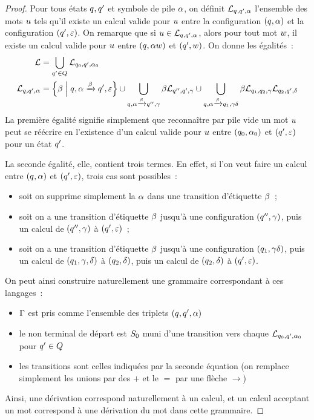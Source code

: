 \begin{proof}
  Pour tous états $q_{},q_{}'$ et symbole de pile $\alpha$, on définit
  $\mathcal L_{q_{},q_{}',\alpha}$ l'ensemble des mots $u$ tels qu'il existe
  un calcul valide pour $u$ entre la configuration $(q_{},\alpha)$ et la
  configuration $(q_{}',\varepsilon)$. On remarque que si
  $u \in \mathcal L_{q_{},q_{}',\alpha}$, alors pour tout mot $w$, il existe
  un calcul valide pour $u$ entre $(q_{},\alpha w)$ et
  $(q_{}',w)$. On donne les égalités~:
  \begin{align*}
    \mathcal L &=
    \displaystyle\bigcup_{q_{}' \in Q_{}} \mathcal L_{q_{0},q_{}',\alpha_0} \\
    \mathcal L_{q_{},q_{}',\alpha} &=
    \left\{ \beta \;\middle\vert\; q_{},\alpha \xrightarrow{\beta} q_{}',\varepsilon \right\}
    \cup\displaystyle\bigcup_{q_{},\alpha\xrightarrow{\beta} q_{}'',\gamma}
    \beta\mathcal L_{q_{}'',q_{}',\gamma}
    \cup\bigcup_{q_{},\alpha\xrightarrow{\beta} q_{1},\gamma\delta}
    \beta\mathcal L_{q_{1},q_{2},\gamma}\mathcal L_{q_{2},q_{}',\delta}
  \end{align*}
  La première égalité signifie simplement que reconnaître par pile vide un mot
  $u$ peut se réécrire en l'existence d'un calcul valide pour $u$
  entre $(q_{0},\alpha_0)$ et $(q_{}',\varepsilon)$ pour un état $q_{}'$.

  La seconde égalité, elle, contient trois termes. En effet, si l'on veut faire
  un calcul entre $(q_{},\alpha)$ et $(q_{}',\varepsilon)$, trois cas sont
  possibles~:
  \begin{itemize}
  \item soit on supprime simplement la $\alpha$ dans une transition d'étiquette
    $\beta$~;
  \item soit on a une transition d'étiquette $\beta$ jusqu'à une configuration
    $(q_{}'',\gamma)$, puis un calcul de $(q_{}'',\gamma)$ à $(q_{}',\varepsilon)$~;
  \item soit on a une transition d'étiquette $\beta$ jusqu'à une configuration
    $(q_{1},\gamma\delta)$, puis un calcul de $(q_{1},\gamma,\delta)$ à
    $(q_{2},\delta)$, puis un calcul de $(q_{2},\delta)$ à
    $(q_{}',\varepsilon)$.
  \end{itemize}
  On peut ainsi construire naturellement une grammaire correspondant à ces
  langages~:
  \begin{itemize}
  \item $\Gamma$ est pris comme l'ensemble des triplets $(q_{},q_{}',\alpha)$
  \item le non terminal de départ est $S_{0}$ muni d'une transition vers chaque
    $\mathcal L_{q_{0},q_{}',\alpha_0}$ pour $q_{}' \in Q_{}$
  \item les transitions sont celles indiquées par la seconde équation (on
    remplace simplement les unions par des $+$ et le $=$ par une flèche $\to$)
  \end{itemize}
  Ainsi, une dérivation correspond naturellement à un calcul, et un calcul
  acceptant un mot correspond à une dérivation du mot dans cette grammaire.
\end{proof}

